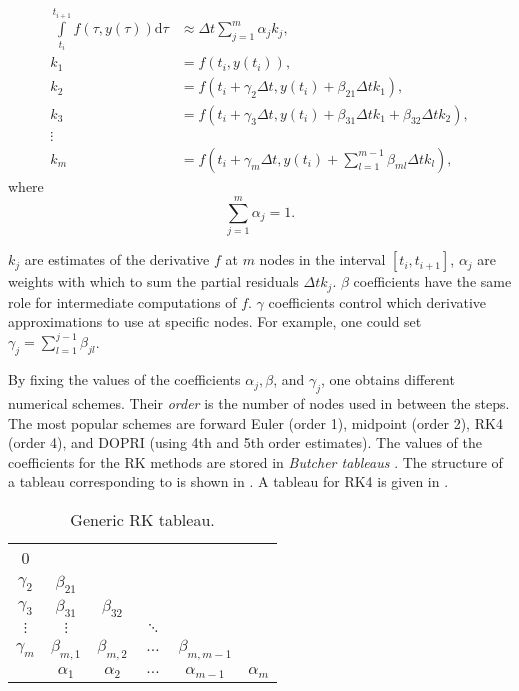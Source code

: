 \begin{align}
  \int \limits_{t_i}^{t_{i+1}} f(\tau, y(\tau)) \mathrm{d} \tau &\approx \Delta t \sum \limits_{j=1}^{m} \alpha_j k_j,\label{eq:rk_first}\\
  k_1 &= f(t_i, y(t_i)),\\
  k_2 &= f(t_i + \gamma_2 \Delta t, y(t_i) + \beta_{21} \Delta t k_1), \\
  k_3 &= f(t_i + \gamma_3 \Delta t, y(t_i) + \beta_{31} \Delta t k_1 + \beta_{32} \Delta t k_2),\\
  \vdots & \\
  k_m &= f(t_i + \gamma_m \Delta t, y(t_i) + \sum \limits_{l=1}^{m-1} \beta_{ml} \Delta t k_l), \label{eq:rk_last}
\end{align}
where
\begin{equation}
    \sum \limits_{j=1}^{m} \alpha_j = 1.
\end{equation}

$k_j$ are estimates of the derivative $f$ at $m$ nodes in the interval $[t_i, t_{i+1}]$, $\alpha_j$ are weights with which to sum the partial residuals $\Delta t k_j$. $\beta$ coefficients have the same role for intermediate computations of $f$. $\gamma$ coefficients control which derivative approximations to use at specific nodes. For example, one could set $\gamma_j = \sum \limits_{l=1}^{j-1} \beta_{jl}$.

By fixing the values of the coefficients $\alpha_j, \beta$, and $\gamma_j$, one obtains different numerical schemes. Their \emph{order} is the number of nodes used in between the steps. The most popular schemes are forward Euler (order 1), midpoint (order 2), \ac{RK}4 (order 4), and \ac{DOPRI} (using 4th and 5th order estimates). The values of the coefficients for the \ac{RK} methods are stored in \emph{Butcher tableaus} \cite{Atkinson2009}. The structure of a tableau corresponding to is shown in . A tableau for \ac{RK}4 is given in .

\begin{table}
  \centering
  \caption{Generic \acl{RK} tableau.}
  \begin{tabular}{c | c c c c c}
    0 & & & & &\\
    $\gamma_2$ & $\beta_{21}$ & & & &\\
    $\gamma_3$ & $\beta_{31}$ & $\beta_{32}$ & & &\\
    $\vdots$ & $\vdots$ & & $\ddots$ & &\\ 
    $\gamma_m$ & $\beta_{m,1}$ & $\beta_{m,2}$ & $\dots$ & $\beta_{m,m-1}$ &\\ \hline
           & $\alpha_1$ & $\alpha_2$ & $\dots$ & $\alpha_{m-1}$ & $\alpha_m$ \\
  \end{tabular}
  \label{tab:rk_tableau}
\end{table}

